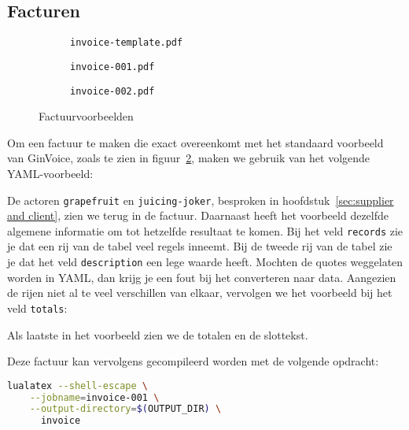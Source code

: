 \subsection{Facturen}
\begin{figure}[!ht]
    \begin{subfigure}{.32\linewidth}
        \caption{\texttt{invoice-template.pdf}}\label{fig:result alt}
    \end{subfigure}\hfill
    \begin{subfigure}{.32\linewidth}
        \caption{\texttt{invoice-001.pdf}}\label{fig:result 1}
    \end{subfigure}\hfill
    \begin{subfigure}{.32\linewidth}
        \caption{\texttt{invoice-002.pdf}}\label{fig:result 2}
    \end{subfigure}
    \caption{Factuurvoorbeelden}\label{fig:pdfs}
\end{figure}
\begin{multicols}{2}
    \noindent
    Om een factuur te maken die exact overeenkomt met het standaard voorbeeld van GinVoice, zoals te zien in figuur~\ref{fig:result 1}, maken we gebruik van het volgende YAML-voorbeeld:
    
    De actoren \texttt{grapefruit} en \texttt{juicing-joker}, besproken in hoofdstuk~\ref{sec:supplier and client}, zien we terug in de factuur.
    Daarnaast heeft het voorbeeld dezelfde algemene informatie om tot hetzelfde resultaat te komen.
    Bij het veld \texttt{records} zie je dat een rij van de tabel veel regels inneemt.
    Bij de tweede rij van de tabel zie je dat het veld \texttt{description} een lege waarde heeft.
    \columnbreak
    Mochten de quotes weggelaten worden in YAML, dan krijg je een fout bij het converteren naar data.
    Aangezien de rijen niet al te veel verschillen van elkaar, vervolgen we het voorbeeld bij het veld \texttt{totals}:
    
    Als laatste in het voorbeeld zien we de totalen en de slottekst.

    Deze factuur kan vervolgens gecompileerd worden met de volgende opdracht:
    \begin{lstlisting}[language=bash]
lualatex --shell-escape \
    --jobname=invoice-001 \
    --output-directory=$(OUTPUT_DIR) \
      invoice
    \end{lstlisting}
\end{multicols}
\twocolumn

